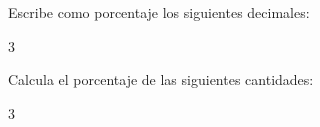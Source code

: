 \documentclass[12pt,addpoints,answers]{evalua}
\begin{document}
\begin{questions}

    \question[6] Escribe como porcentaje los siguientes decimales:

    \begin{multicols}{3}
    \end{multicols}


    \question[10] Calcula el porcentaje de las siguientes cantidades:

    \begin{multicols}{3}
    \begin{parts}

\end{parts}
\end{multicols}
\end{questions}
\end{document}
